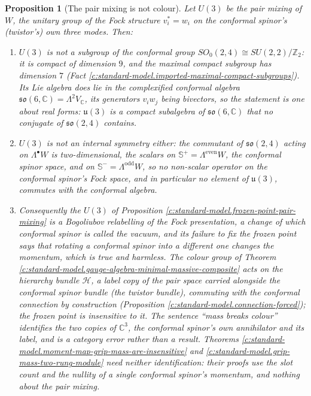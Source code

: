 \documentclass[11pt]{article}
\newtheorem{proposition}[theorem]{Proposition}
\theoremstyle{definition}
\theoremstyle{plain}
\newcommand{\changedmark}[2]{\marginpar{\raggedright\scriptsize\color{#1}#2}}
\providecommand{\C}{}\renewcommand{\C}{\mathbb{C}}
\providecommand{\CS}{}\renewcommand{\CS}{{\mathbb{S}^{+}}}
\providecommand{\CSm}{}\renewcommand{\CSm}{{\mathbb{S}^{-}}}
\providecommand{\so}{}\renewcommand{\so}{\mathfrak{so}}
\providecommand{\uu}{}\renewcommand{\uu}{\mathfrak{u}}
\begin{document}
\begin{proposition}[The pair mixing is not colour]\label{c:standard-model.pair-mixing-not-colour}
\changedmark{gray}{reworded}
Let $U(3)$ be the pair mixing of $W$, the unitary group of the Fock structure $v_{i}^{*} = w_{i}$ on the conformal spinor's (twistor's) own three modes. Then:
\begin{enumerate}
\item[(i)] $U(3)$ is not a subgroup of the conformal group $SO_{0}(2,4) \cong SU(2,2)/\mathbb{Z}_{2}$: it is compact of dimension $9$, and the maximal compact subgroup has dimension $7$ (Fact \ref{c:standard-model.imported-maximal-compact-subgroups}). Its Lie algebra does lie in the complexified conformal algebra $\so(6, \C) = \Lambda^{2}V_{\C}$, its generators $v_{i}w_{j}$ being bivectors, so the statement is one about real forms: $\uu(3)$ is a compact subalgebra of $\so(6,\C)$ that no conjugate of $\so(2,4)$ contains.
\item[(ii)] $U(3)$ is not an internal symmetry either: the commutant of $\so(2,4)$ acting on $\Lambda^{\bullet}W$ is two-dimensional, the scalars on $\CS = \Lambda^{\mathrm{even}}W$, the conformal spinor space, and on $\CSm{} = \Lambda^{\mathrm{odd}}W$, so no non-scalar operator on the conformal spinor's Fock space, and in particular no element of $\uu(3)$, commutes with the conformal algebra.
\item[(iii)] Consequently the $U(3)$ of Proposition \ref{c:standard-model.frozen-point-pair-mixing} is a Bogoliubov relabelling of the Fock presentation, a change of which conformal spinor is called the vacuum, and its failure to fix the frozen point says that rotating a conformal spinor into a different one changes the momentum, which is true and harmless. The colour group of Theorem \ref{c:standard-model.gauge-algebra-minimal-massive-composite} acts on the hierarchy bundle $\mathcal{H}$, a label copy of the pair space carried alongside the conformal spinor bundle (the twistor bundle), commuting with the conformal connection by construction (Proposition \ref{c:standard-model.connection-forced}); the frozen point is insensitive to it. The sentence ``mass breaks colour'' identifies the two copies of $\C^{3}$, the conformal spinor's own annihilator and its label, and is a category error rather than a result. Theorems \ref{c:standard-model.moment-map-grip-mass-are-insensitive} and \ref{c:standard-model.grip-mass-two-rung-module} need neither identification: their proofs use the slot count and the nullity of a single conformal spinor's momentum, and nothing about the pair mixing.
\end{enumerate}
\end{proposition}
\end{document}
